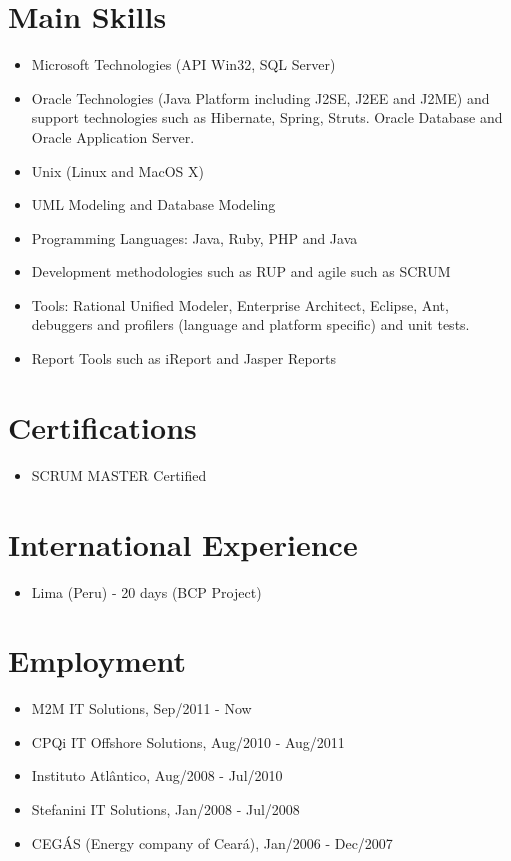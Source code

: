 \documentclass[letterpaper]{article}
\begin{document}
\section*{Main Skills}
\begin{itemize}
  \item Microsoft Technologies (API Win32, SQL Server)
  \item Oracle Technologies (Java Platform including J2SE, J2EE and J2ME) and support
    technologies such as Hibernate, Spring, Struts.
    Oracle Database and Oracle Application Server.
  \item Unix (Linux and MacOS X)
  \item UML Modeling and Database Modeling
  \item Programming Languages: Java, Ruby, PHP and Java
  \item Development methodologies such as RUP and agile such as SCRUM
  \item Tools: Rational Unified Modeler, Enterprise Architect, Eclipse, Ant, debuggers and profilers (language and platform
specific) and unit tests.
  \item Report Tools such as iReport and Jasper Reports
\end{itemize}

\section*{Certifications}
\begin{itemize}
  \item SCRUM MASTER Certified
\end{itemize}

\section*{International Experience}
\begin{itemize}
  \item Lima (Peru) - 20 days (BCP Project)
\end{itemize}

\section*{Employment}
\begin{itemize}
\item M2M IT Solutions, Sep/2011 - Now
\item CPQi IT Offshore Solutions, Aug/2010 - Aug/2011
\item Instituto Atlântico, Aug/2008 - Jul/2010
\item Stefanini IT Solutions, Jan/2008 - Jul/2008
\item CEGÁS (Energy company of Ceará), Jan/2006 - Dec/2007
\end{itemize}
\end{document}

